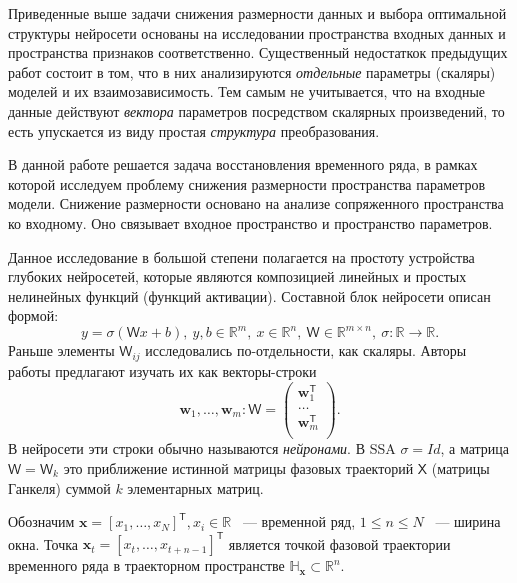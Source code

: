 \documentclass[12pt, twoside]{article}
\begin{document}
Приведенные выше задачи снижения размерности данных и выбора оптимальной структуры нейросети основаны на исследовании пространства входных данных и пространства признаков соответственно. Существенный недостаткок предыдущих работ состоит в том, что в них анализируются \textit{отдельные} параметры (скаляры) моделей и их взаимозависимость. Тем самым не учитывается, что на входные данные действуют \textit{вектора} параметров посредством скалярных произведений, то есть упускается из виду простая \textit{структура} преобразования.

В данной работе решается задача восстановления временного ряда, в рамках которой исследуем проблему снижения размерности пространства параметров модели. Снижение размерности основано на анализе сопряженного пространства ко входному. Оно связывает входное пространство и пространство параметров. 



Данное исследование в большой степени полагается на простоту устройства глубоких нейросетей, которые являются композицией линейных и простых нелинейных функций (функций активации). Составной блок нейросети описан формой:  \[y=\sigma(\mathsf{W}x + b), \ y, b \in \mathbb{R}^m, \ x \in \mathbb{R}^n, \ \mathsf{W} \in \mathbb{R}^{m \times n}, \ \sigma: \mathbb{R} \to \mathbb{R}.\] Раньше элементы $\mathsf{W}_{ij}$ исследовались по-отдельности, как скаляры. Авторы работы предлагают изучать их как векторы-строки \[\mathbf{w}_1, \dots, \mathbf{w}_m: \mathsf{W} = \begin{pmatrix}
\mathbf{w}_1^{\mathsf{T}}\\
\dots\\
\mathbf{w}_m^{\mathsf{T}}\\
\end{pmatrix}.\] В нейросети эти строки обычно называются \textit{нейронами}. В SSA $\sigma = Id$, а матрица $\mathsf{W}=\mathsf{W}_k$ это приближение истинной матрицы фазовых траекторий $\mathsf{X}$ (матрицы Ганкеля) суммой $k$ элементарных матриц.


Обозначим $\mathbf{x} = [x_1, \dots, x_N]^{\mathsf{T}}, x_i \in \mathbb{R}$ ~--- временной ряд, $1 \le n \le N$ ~--- ширина окна. Точка $\mathbf{x}_t = [x_t, \dots, x_{t + n - 1}]^{\mathsf{T}}$ является точкой фазовой траектории временного ряда в траекторном пространстве $\mathbb{H}_{\mathbf{x}} \subset \mathbb{R}^n$. 
\end{document}
